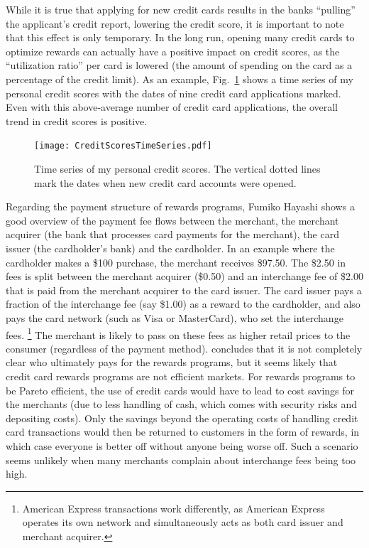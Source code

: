 While it is true that applying for new credit cards results in the banks ``pulling'' the applicant's credit report, lowering the credit score, it is important to note that this effect is only temporary. In the long run, opening many credit cards to optimize rewards can actually have a positive impact on credit scores, as the ``utilization ratio'' per card is lowered (the amount of spending on the card as a percentage of the credit limit). 
As an example, Fig.~\ref{fig:FICOTimeline} shows a time series of my personal credit scores with the dates of nine credit card applications marked. Even with this above-average number of credit card applications, the overall trend in credit scores is positive.

\begin{figure}[t!h]
    \begin{center}
    \texttt{[image: CreditScoresTimeSeries.pdf]}
    \caption{Time series of my personal credit scores. The vertical dotted lines mark the dates when new credit card accounts were opened.}
    \label{fig:FICOTimeline}
    \end{center}
\end{figure}

Regarding the payment structure of rewards programs, Fumiko Hayashi \citeyearpar{hayashi:2009} shows a good overview of the payment fee flows between the merchant, the merchant acquirer (the bank that processes card payments for the merchant), the card issuer (the cardholder's bank) and the cardholder.
In an example where the cardholder makes a \$100 purchase, the merchant receives \$97.50. The \$2.50 in fees is split between the merchant acquirer (\$0.50) and an interchange fee of \$2.00 that is paid from the merchant acquirer to the card issuer. The card issuer pays a fraction of the interchange fee (say \$1.00) as a reward to the cardholder, and also pays the card network (such as Visa or MasterCard), who set the interchange fees.%
\footnote{American Express transactions work differently, as American Express operates its own network and simultaneously acts as both card issuer and merchant acquirer.}
The merchant is likely to pass on these fees as higher retail prices to the consumer (regardless of the payment method). \citet{hayashi:2009} concludes that it is not completely clear who ultimately pays for the rewards programs, but it seems likely that credit card rewards programs are not efficient markets. 
For rewards programs to be Pareto efficient, the use of credit cards would have to lead to cost savings for the merchants (due to less handling of cash, which comes with security risks and depositing costs). 
Only the savings beyond the operating costs of handling credit card transactions would then be returned to customers in the form of rewards, in which case everyone is better off without anyone being worse off. Such a scenario seems unlikely when many merchants complain about interchange fees being too high. 

